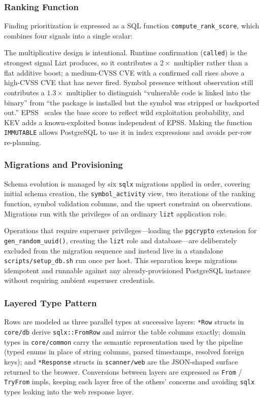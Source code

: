 \documentclass[conference]{IEEEtran}
\begin{document}
\subsubsection{Ranking Function}

Finding prioritization is expressed as a SQL function \texttt{compute\_rank\_score}, which combines four signals into a single scalar:

The multiplicative design is intentional. Runtime confirmation (\texttt{called}) is the strongest signal Lizt produces, so it contributes a $2\times$ multiplier rather than a flat additive boost; a medium-CVSS CVE with a confirmed call rises above a high-CVSS CVE that has never fired. Symbol presence without observation still contributes a $1.3\times$ multiplier to distinguish ``vulnerable code is linked into the binary'' from ``the package is installed but the symbol was stripped or backported out.'' EPSS~\cite{epss} scales the base score to reflect wild exploitation probability, and KEV adds a known-exploited bonus independent of EPSS. Making the function \texttt{IMMUTABLE} allows PostgreSQL to use it in index expressions and avoids per-row re-planning.

\subsubsection{Migrations and Provisioning}

Schema evolution is managed by six \texttt{sqlx} migrations applied in order, covering initial schema creation, the \texttt{symbol\_activity} view, two iterations of the ranking function, symbol validation columns, and the upsert constraint on observations. Migrations run with the privileges of an ordinary \texttt{lizt} application role.

Operations that require superuser privileges---loading the \texttt{pgcrypto} extension for \texttt{gen\_random\_uuid()}, creating the \texttt{lizt} role and database---are deliberately excluded from the migration sequence and instead live in a standalone \texttt{scripts/setup\_db.sh} run once per host. This separation keeps migrations idempotent and runnable against any already-provisioned PostgreSQL instance without requiring ambient superuser credentials.

\subsubsection{Layered Type Pattern}

Rows are modeled as three parallel types at successive layers: \texttt{*Row} structs in \texttt{core/db} derive \texttt{sqlx::FromRow} and mirror the table columns exactly; domain types in \texttt{core/common} carry the semantic representation used by the pipeline (typed enums in place of string columns, parsed timestamps, resolved foreign keys); and \texttt{*Response} structs in \texttt{scanner/web} are the JSON-shaped surface returned to the browser. Conversions between layers are expressed as \texttt{From} / \texttt{TryFrom} impls, keeping each layer free of the others' concerns and avoiding \texttt{sqlx} types leaking into the web response layer.
\end{document}
